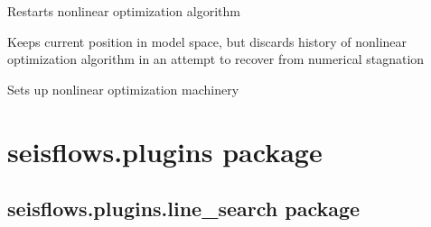 \documentclass[letterpaper,10pt,english]{sphinxmanual}
\begin{document}
\begin{fulllineitems}
\begin{fulllineitems}
\label{\detokenize{ref/seisflows.optimize:seisflows.optimize.steepest_descent.steepest_descent.restart}}
Restarts nonlinear optimization algorithm

Keeps current position in model space, but discards history of
nonlinear optimization algorithm in an attempt to recover from
numerical stagnation

\end{fulllineitems}


\begin{fulllineitems}
\label{\detokenize{ref/seisflows.optimize:seisflows.optimize.steepest_descent.steepest_descent.restarted}}
\end{fulllineitems}


\begin{fulllineitems}
\label{\detokenize{ref/seisflows.optimize:seisflows.optimize.steepest_descent.steepest_descent.setup}}
Sets up nonlinear optimization machinery

\end{fulllineitems}


\end{fulllineitems}



\section{seisflows.plugins package}
\label{\detokenize{ref/seisflows.plugins:seisflows-plugins-package}}\label{\detokenize{ref/seisflows.plugins::doc}}

\subsection{seisflows.plugins.line\_search package}
\label{\detokenize{ref/seisflows.plugins.line_search:seisflows-plugins-line-search-package}}\label{\detokenize{ref/seisflows.plugins.line_search::doc}}
\end{document}
